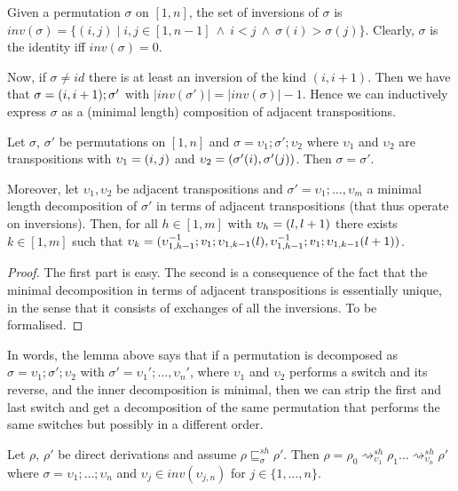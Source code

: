 \documentclass{llncs}
\newcommand{\interval}[2][1]{\ensuremath{[{#1},{#2}]}}
\newcommand{\perm}{\sigma}
\newcommand{\inv}[1]{\ensuremath{inv}({#1})}
\newcommand{\shiftdir}[1][]{\ensuremath{\mathrel{{\rightsquigarrow}^{\mathit{sh}}_{#1}}}}
\newcommand{\shiftpre}[1][]{\ensuremath{\mathrel{{\sqsubseteq}^{\mathit{sh}}_{#1}}}}
\begin{document}
Given a permutation $\perm$ on $\interval{n}$, the set of inversions
of $\perm$ is
$\inv{\perm} = \{ (i,j) \mid i,j \in \interval{n-1}\ \land\ i<j\
\land\ \perm(i) > \perm(j) \}$. Clearly, $\perm$ is the identity iff
$\inv{\perm}=0$.

Now, if $\perm \neq id$ there is at least an inversion of the kind
$(i,i+1)$.  Then we have that $\perm = \transp{i}; \perm'$
with $|\inv{\perm'}| = |\inv{\perm}| -1$. Hence we can inductively
express $\perm$ as a (minimal length) composition of adjacent
transpositions.


\begin{lemma}[on permutations]
  \label{le:perm}
  Let $\perm$, $\perm'$ be permutations on $\interval{n}$ and
  $\perm = \upsilon_1; \perm'; \upsilon_2$ where $\upsilon_1$ and $\upsilon_2$
  are transpositions with $\upsilon_1 = \transp{i}[j]$ and
  $\upsilon_2 = \transp{\perm'(i)}[\perm'(j)]$. Then $\sigma =
  \sigma'$.

  Moreover, let $\upsilon_1, \upsilon_2$ be adjacent
  transpositions and $\sigma' = \upsilon_1; \ldots, \upsilon_m$ a
  minimal length decomposition of $\sigma'$ in terms of adjacent
  transpositions (that thus operate on inversions). Then, for all
  $h \in \interval{m}$ with $\upsilon_h = \transp{l}[l+1]$ there exists
  $k \in \interval{m}$ such that
  $\upsilon_k = \transp{\upsilon_{1,h-1}^{-1};v_1;
    \upsilon_{1,k-1}(l)}[\upsilon_{1,h-1}^{-1};v_1; \upsilon_{1,k-1}(l+1)]$.
\end{lemma}

\begin{proof}
  The first part is easy. The second is a consequence of the fact that
  the minimal decomposition in terms of adjacent transpositions is
  essentially unique, in the sense that it consists of exchanges of
  all the inversions. To be formalised.
\end{proof}

In words, the lemma above says that if a permutation is decomposed as $\sigma = \upsilon_1; \sigma'; \upsilon_2$ with $\sigma' = \upsilon_1'; \ldots, \upsilon_n'$, where $\upsilon_1$ and $\upsilon_2$ performs a switch and its reverse, and the inner decomposition is minimal, then we can strip the first and last switch and get a decomposition of the same permutation that performs the same switches but possibly in a different order.


\begin{lemma}
  \label{le:no-useless-shifts}
  Let $\rho$, $\rho'$ be direct derivations and assume
  $\rho \shiftpre[\sigma] \rho'$. Then
  $\rho = \rho_0 \shiftdir[\upsilon_1] \rho_1 \ldots \shiftdir[\upsilon_n ]
  \rho'$ where $\sigma = \upsilon_1; \ldots; \upsilon_n$ and $\upsilon_j \in \inv{\upsilon_{j,n}}$ for $j \in \{1, \ldots,n\}$.
\end{lemma}
\end{document}
